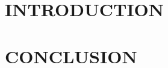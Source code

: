 \documentclass[12pt,a4paper,notitlepage]{article}
\begin{document}
\section{\Large INTRODUCTION}



\section{\Large CONCLUSION}



\end{document}

